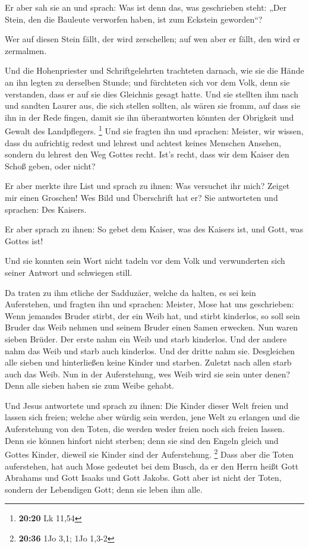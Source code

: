  Er aber sah sie an und sprach: Was ist denn das, was
geschrieben steht: „Der Stein, den die Bauleute verworfen haben, ist zum
Eckstein geworden``?

 Wer auf diesen Stein fällt, der wird zerschellen; auf
wen aber er fällt, den wird er zermalmen.

 Und die Hohenpriester und Schriftgelehrten trachteten
darnach, wie sie die Hände an ihn legten zu derselben Stunde; und
fürchteten sich vor dem Volk, denn sie verstanden, dass er auf sie dies
Gleichnis gesagt hatte.  Und sie stellten ihm nach und
sandten Laurer aus, die sich stellen sollten, als wären sie fromm, auf
dass sie ihn in der Rede fingen, damit sie ihn überantworten könnten der
Obrigkeit und Gewalt des Landpflegers. \footnote{\textbf{20:20} Lk 11,54}
 Und sie fragten ihn und sprachen: Meister, wir wissen,
dass du aufrichtig redest und lehrest und achtest keines Menschen
Ansehen, sondern du lehrest den Weg Gottes recht.  Ist's
recht, dass wir dem Kaiser den Schoß geben, oder nicht?

 Er aber merkte ihre List und sprach zu ihnen: Was
versuchet ihr mich?  Zeiget mir einen Groschen! Wes Bild
und Überschrift hat er? Sie antworteten und sprachen: Des Kaisers.

 Er aber sprach zu ihnen: So gebet dem Kaiser, was des
Kaisers ist, und Gott, was Gottes ist!

 Und sie konnten sein Wort nicht tadeln vor dem Volk und
verwunderten sich seiner Antwort und schwiegen still.

 Da traten zu ihm etliche der Sadduzäer, welche da
halten, es sei kein Auferstehen, und fragten ihn  und
sprachen: Meister, Mose hat uns geschrieben: Wenn jemandes Bruder
stirbt, der ein Weib hat, und stirbt kinderlos, so soll sein Bruder das
Weib nehmen und seinem Bruder einen Samen erwecken.  Nun
waren sieben Brüder. Der erste nahm ein Weib und starb kinderlos.
 Und der andere nahm das Weib und starb auch kinderlos.
 Und der dritte nahm sie. Desgleichen alle sieben und
hinterließen keine Kinder und starben.  Zuletzt nach
allen starb auch das Weib.  Nun in der Auferstehung, wes
Weib wird sie sein unter denen? Denn alle sieben haben sie zum Weibe
gehabt.

 Und Jesus antwortete und sprach zu ihnen: Die Kinder
dieser Welt freien und lassen sich freien;  welche aber
würdig sein werden, jene Welt zu erlangen und die Auferstehung von den
Toten, die werden weder freien noch sich freien lassen. 
Denn sie können hinfort nicht sterben; denn sie sind den Engeln gleich
und Gottes Kinder, dieweil sie Kinder sind der Auferstehung. \footnote{\textbf{20:36}
  1Jo 3,1; 1Jo 1,3-2}  Dass aber die Toten auferstehen,
hat auch Mose gedeutet bei dem Busch, da er den Herrn heißt Gott
Abrahams und Gott Isaaks und Gott Jakobs.  Gott aber ist
nicht der Toten, sondern der Lebendigen Gott; denn sie leben ihm alle.

